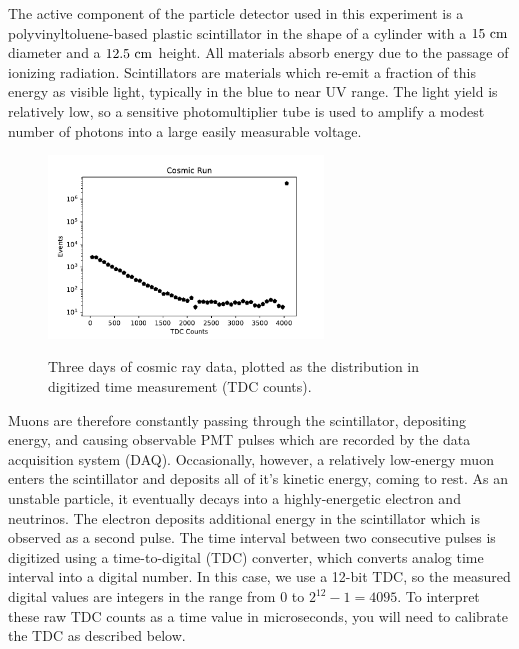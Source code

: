 The active component of the particle detector used in this experiment
is a polyvinyltoluene-based plastic scintillator in the shape of a
cylinder with a $15~\rm cm$ diameter and a $12.5~\rm cm$ height.  All
materials absorb energy due to the passage of ionizing radiation.
Scintillators are materials which re-emit a fraction of this energy as
visible light, typically in the blue to near UV range.  The light
yield is relatively low, so a sensitive photomultiplier tube is used
to amplify a modest number of photons into a large easily measurable
voltage.

\begin{figure}[htbp]
\begin{center}
{\includegraphics[width=0.65\textwidth]{figs/labs/muon/cosmics_raw.pdf}}\\
\end{center}
\caption{\label{fig:cosmics_raw}  Three days of cosmic ray data, plotted as the distribution in digitized time measurement (TDC counts).}
\end{figure}


Muons are therefore constantly passing through the scintillator,
depositing energy, and causing observable PMT pulses which are
recorded by the data acquisition system (DAQ).  Occasionally, however,
a relatively low-energy muon enters the scintillator and deposits all
of it's kinetic energy, coming to rest.  As an unstable particle, it
eventually decays into a highly-energetic electron and neutrinos.  The
electron deposits additional energy in the scintillator which is
observed as a second pulse.  The time interval between two consecutive
pulses is digitized using a time-to-digital (TDC) converter, which
converts analog time interval into a digital number.  In this case, we
use a 12-bit TDC, so the measured digital values are integers in the
range from 0 to $2^{12}-1 = 4095$.  To interpret these raw TDC counts
as a time value in microseconds, you will need to calibrate the TDC as
described below.

